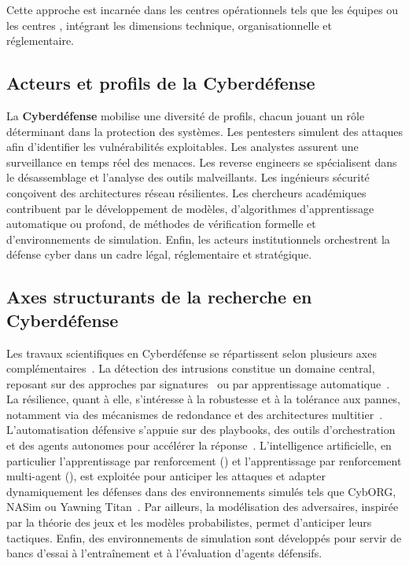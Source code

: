 Cette approche est incarnée dans les centres opérationnels tels que les équipes  ou les centres , intégrant les dimensions technique, organisationnelle et réglementaire.

\subsection*{Acteurs et profils de la Cyberdéfense}

La \textbf{Cyberdéfense} mobilise une diversité de profils, chacun jouant un rôle déterminant dans la protection des systèmes. Les pentesters simulent des attaques afin d'identifier les vulnérabilités exploitables. Les analystes  assurent une surveillance en temps réel des menaces. Les reverse engineers se spécialisent dans le désassemblage et l'analyse des outils malveillants. Les ingénieurs sécurité conçoivent des architectures réseau résilientes. Les chercheurs académiques contribuent par le développement de modèles, d'algorithmes d'apprentissage automatique ou profond, de méthodes de vérification formelle et d'environnements de simulation. Enfin, les acteurs institutionnels orchestrent la défense cyber dans un cadre légal, réglementaire et stratégique.


\subsection*{Axes structurants de la recherche en Cyberdéfense}

Les travaux scientifiques en Cyberdéfense se répartissent selon plusieurs axes complémentaires~\cite{Buczak2016}. La détection des intrusions constitue un domaine central, reposant sur des approches par signatures~\cite{Axelsson2000} ou par apprentissage automatique~\cite{Sommer2010,Buczak2016}. La résilience, quant à elle, s'intéresse à la robustesse et à la tolérance aux pannes, notamment via des mécanismes de redondance et des architectures multitier~\cite{Bodeau2011}. L'automatisation défensive s'appuie sur des playbooks, des outils d'orchestration et des agents autonomes pour accélérer la réponse~\cite{Hazra2022}. L'intelligence artificielle, en particulier l'apprentissage par renforcement () et l'apprentissage par renforcement multi-agent (), est exploitée pour anticiper les attaques et adapter dynamiquement les défenses dans des environnements simulés tels que CybORG, NASim ou Yawning Titan~\cite{Standen2021, nasim2023,Andrew2022}. Par ailleurs, la modélisation des adversaires, inspirée par la théorie des jeux et les modèles probabilistes, permet d'anticiper leurs tactiques. Enfin, des environnements de simulation sont développés pour servir de bancs d'essai à l'entraînement et à l'évaluation d'agents défensifs.


